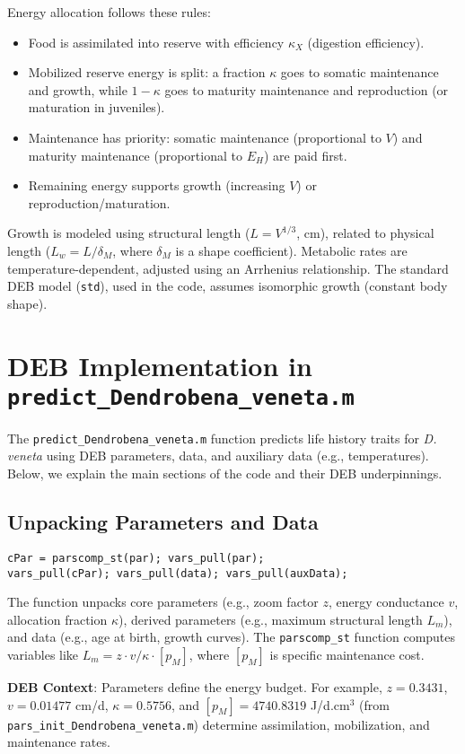 \documentclass[11pt]{article}
\begin{document}
Energy allocation follows these rules:
\begin{itemize}
    \item Food is assimilated into reserve with efficiency $\kappa_X$ (digestion efficiency).
    \item Mobilized reserve energy is split: a fraction $\kappa$ goes to somatic maintenance and growth, while $1-\kappa$ goes to maturity maintenance and reproduction (or maturation in juveniles).
    \item Maintenance has priority: somatic maintenance (proportional to $V$) and maturity maintenance (proportional to $E_H$) are paid first.
    \item Remaining energy supports growth (increasing $V$) or reproduction/maturation.
\end{itemize}

Growth is modeled using structural length ($L = V^{1/3}$, cm), related to physical length ($L_w = L / \delta_M$, where $\delta_M$ is a shape coefficient). Metabolic rates are temperature-dependent, adjusted using an Arrhenius relationship. The standard DEB model (\texttt{std}), used in the code, assumes isomorphic growth (constant body shape).

\section{DEB Implementation in \texttt{predict\_Dendrobena\_veneta.m}}
The \texttt{predict\_Dendrobena\_veneta.m} function predicts life history traits for \textit{D. veneta} using DEB parameters, data, and auxiliary data (e.g., temperatures). Below, we explain the main sections of the code and their DEB underpinnings.

\subsection{Unpacking Parameters and Data}
\begin{verbatim}
cPar = parscomp_st(par); vars_pull(par);
vars_pull(cPar); vars_pull(data); vars_pull(auxData);
\end{verbatim}
The function unpacks core parameters (e.g., zoom factor $z$, energy conductance $v$, allocation fraction $\kappa$), derived parameters (e.g., maximum structural length $L_m$), and data (e.g., age at birth, growth curves). The \texttt{parscomp\_st} function computes variables like $L_m = z \cdot v / \kappa \cdot [p_M]$, where $[p_M]$ is specific maintenance cost.

\textbf{DEB Context}: Parameters define the energy budget. For example, $z = 0.3431$, $v = 0.01477$ cm/d, $\kappa = 0.5756$, and $[p_M] = 4740.8319$ J/d.cm$^3$ (from \texttt{pars\_init\_Dendrobena\_veneta.m}) determine assimilation, mobilization, and maintenance rates.
\end{document}
